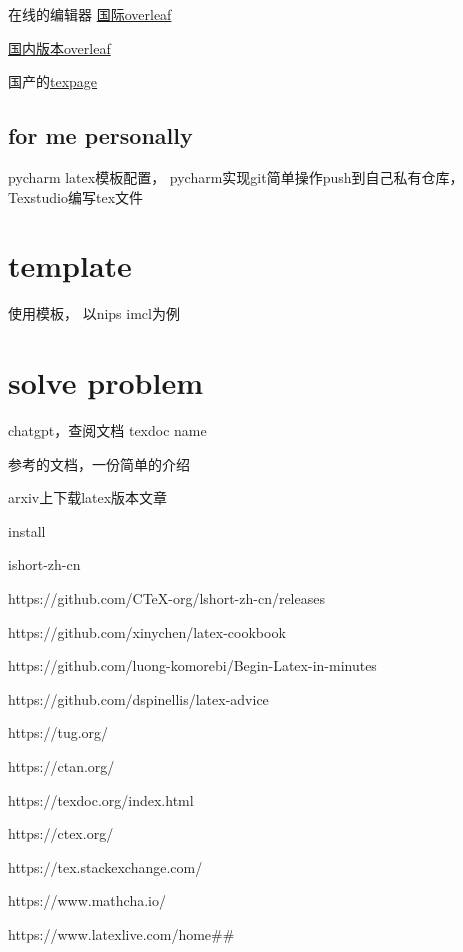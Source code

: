 \documentclass[11pt]{ctexart}
\begin{document}
 在线的编辑器 \href{www.overleaf.com}{国际overleaf}
 
 \href{cn.overleaf.com}{国内版本overleaf}
 
 国产的\href{www.texpage.com}{texpage}
 
 
 \subsection{for me personally}
 
 pycharm latex模板配置， pycharm实现git简单操作push到自己私有仓库，Texstudio编写tex文件
 
 \section{template}

使用模板， 以nips imcl为例\cite{kaelbling1996reinforcement}


\section{solve problem}

 chatgpt，查阅文档  texdoc name\cite{lecun2015deep}

参考的文档，一份简单的介绍\cite{de2019causal}

arxiv上下载latex版本文章\cite{wen2020fighting}

install







ishort-zh-cn

https://github.com/CTeX-org/lshort-zh-cn/releases

https://github.com/xinychen/latex-cookbook

https://github.com/luong-komorebi/Begin-Latex-in-minutes

https://github.com/dspinellis/latex-advice

https://tug.org/

https://ctan.org/

https://texdoc.org/index.html

https://ctex.org/

https://tex.stackexchange.com/

https://www.mathcha.io/

https://www.latexlive.com/home\#\#



\end{document}
